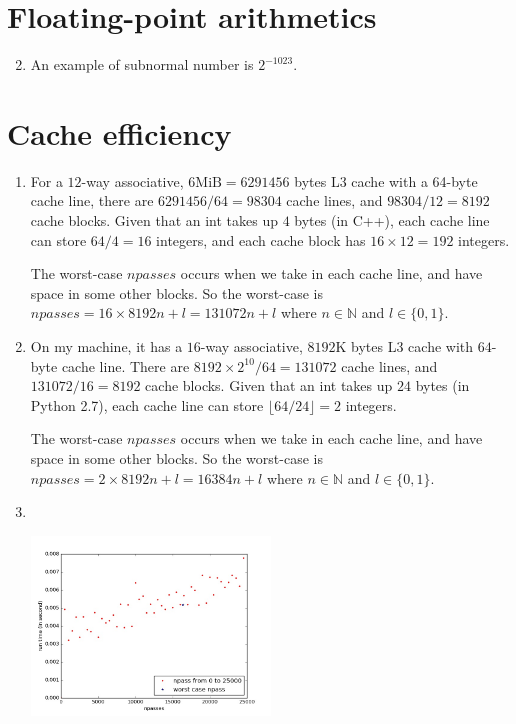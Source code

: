 \documentclass{article}    %
\begin{document}

\section{Floating-point arithmetics}

\begin{enumerate}
	\setcounter{enumi}{1}
	\item An example of subnormal number is $2^{-1023}$.
	
	
\end{enumerate}

\section{Cache efficiency}

\begin{enumerate}
	\item For a $12$-way associative, $6\mathrm{MiB} = 6291456$ bytes L3 cache with a 64-byte cache line, there are $6291456/64 = 98304$ cache lines, and $98304/12 = 8192$ cache blocks. Given that an int takes up $4$ bytes (in C++), each cache line can store $64/4 = 16$ integers, and each cache block has $16 \times 12 = 192$ integers. 
	
	The worst-case $npasses$ occurs when we take in each cache line, and have space in some other blocks. So the worst-case is $npasses = 16 \times 8192 n + l = 131072n + l$ where $n \in \mathbb{N}$ and $l \in \{0,1\}$.
	
	\item On my machine, it has a $16$-way associative, $8192$K bytes L3 cache with $64$-byte cache line. There are $8192 \times 2^{10}/64 = 131072$ cache lines, and $131072/16 = 8192$ cache blocks. Given that an int takes up $24$ bytes (in Python 2.7), each cache line can store $\lfloor64/24\rfloor = 2$ integers.
	
	The worst-case $npasses$ occurs when we take in each cache line, and have space in some other blocks. So the worst-case is $npasses = 2 \times 8192 n + l = 16384n + l$ where $n \in \mathbb{N}$ and $l \in \{0,1\}$.
	
	\item \text{}\\
        \begin{minipage}[t]{\linewidth}
		\centering
		\includegraphics[width=0.5\textwidth]{cache_timing.jpg}
	\end{minipage}
	
\end{enumerate}
\end{document}
